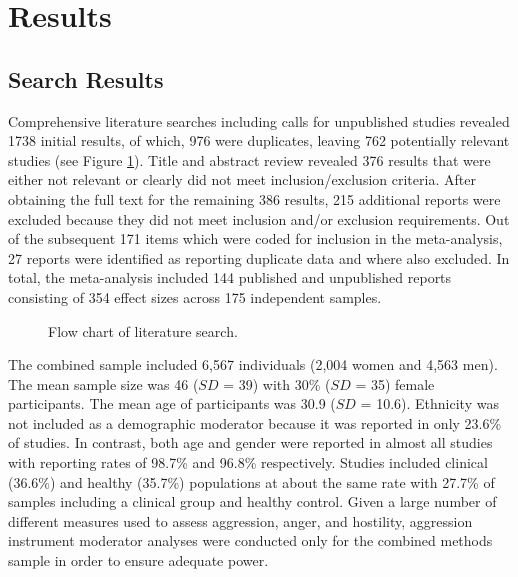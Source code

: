 \documentclass[man]{apa6}\usepackage{graphicx, color}
\begin{document}
\maketitle
%
%




\section{Results}
\subsection{Search Results}



Comprehensive literature searches including calls for unpublished studies revealed 1738 initial results, of which, 976 were duplicates, leaving 762 potentially relevant studies (see Figure \ref{fig:flow}). Title and abstract review revealed 376 results that were either not relevant or clearly did not meet inclusion\slash exclusion criteria. After obtaining the full text for the remaining 386 results, 215 additional reports were excluded because they did not meet inclusion and\slash or exclusion requirements. Out of the subsequent 171 items which were coded for inclusion in the meta-analysis, 27 reports were identified as reporting duplicate data and where also excluded. In total, the meta-analysis included 144 published and unpublished reports consisting of 354 effect sizes across 175 independent samples.


\begin{figure}
   \centering
   \vspace{.8in}
      
   \caption{Flow chart of literature search.}
   \label{fig:flow}
\end{figure}


The combined sample included 6,567 individuals (2,004 women and 4,563 men). The mean sample size was 46 ($SD$ = 39) with 30\% ($SD$ = 35) female participants. The mean age of participants was 30.9 ($SD$ = 10.6). Ethnicity was not included as a demographic moderator because it was reported in only 23.6\% of studies. In contrast, both age and gender were reported in almost all studies with reporting rates of  98.7\% and 96.8\% respectively. Studies included clinical (36.6\%) and healthy (35.7\%) populations at about the same rate with 27.7\% of samples including a clinical group and healthy control. Given a large number of different measures used to assess aggression, anger, and hostility, aggression instrument moderator analyses were conducted only for the combined methods sample in order to ensure adequate power.
\end{document}
